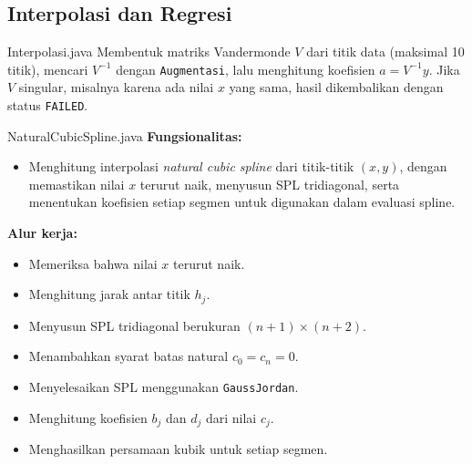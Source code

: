 \subsection{Interpolasi dan Regresi}

\begin{kelas}{Interpolasi.java}
Membentuk matriks Vandermonde $V$ dari titik data (maksimal 10 titik), mencari $V^{-1}$ dengan \texttt{Augmentasi}, lalu menghitung koefisien $a = V^{-1}y$. Jika $V$ singular, misalnya karena ada nilai $x$ yang sama, hasil dikembalikan dengan status \texttt{FAILED}.
 
\end{kelas}

\begin{kelas}{NaturalCubicSpline.java}
\textbf{Fungsionalitas:}
\begin{itemize}
\item Menghitung interpolasi \textit{natural cubic spline} dari titik-titik $(x,y)$, dengan memastikan nilai $x$ terurut naik, menyusun SPL tridiagonal, serta menentukan koefisien setiap segmen untuk digunakan dalam evaluasi spline.
\end{itemize}

\textbf{Alur kerja:}
\begin{itemize}
\item Memeriksa bahwa nilai $x$ terurut naik.
\item Menghitung jarak antar titik $h_j$.
\item Menyusun SPL tridiagonal berukuran $(n+1) \times (n+2)$.
\item Menambahkan syarat batas natural $c_0 = c_n = 0$.
\item Menyelesaikan SPL menggunakan \texttt{GaussJordan}.
\item Menghitung koefisien $b_j$ dan $d_j$ dari nilai $c_j$.
\item Menghasilkan persamaan kubik untuk setiap segmen.
\end{itemize}
 
 
\end{kelas}

